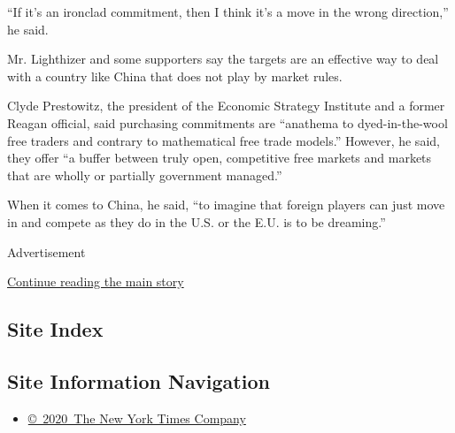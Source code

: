 ``If it's an ironclad commitment, then I think it's a move in the wrong
direction,'' he said.

Mr. Lighthizer and some supporters say the targets are an effective way
to deal with a country like China that does not play by market rules.

Clyde Prestowitz, the president of the Economic Strategy Institute and a
former Reagan official, said purchasing commitments are ``anathema to
dyed-in-the-wool free traders and contrary to mathematical free trade
models.'' However, he said, they offer ``a buffer between truly open,
competitive free markets and markets that are wholly or partially
government managed.''

When it comes to China, he said, ``to imagine that foreign players can
just move in and compete as they do in the U.S. or the E.U. is to be
dreaming.''

Advertisement

\protect\hyperlink{after-bottom}{Continue reading the main story}

\hypertarget{site-index}{%
\subsection{Site Index}\label{site-index}}

\hypertarget{site-information-navigation}{%
\subsection{Site Information
Navigation}\label{site-information-navigation}}

\begin{itemize}
\tightlist
\item
  \href{https://help.nytimes3xbfgragh.onion/hc/en-us/articles/115014792127-Copyright-notice}{©~2020~The
  New York Times Company}
\end{itemize}


